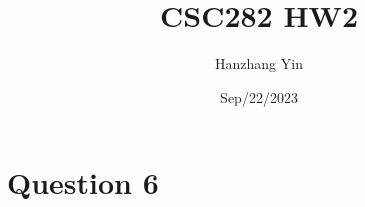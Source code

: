 \documentclass{article}
\title{CSC282 HW2}
\author{Hanzhang Yin}
\date{Sep/22/2023}
\begin{document}
\maketitle

\section*{Question 6}


\begin{comment}
# Helper Function
function CCW(p1, p2, p3):
    #True if counter-clockwise turn
    return (p2.x - p1.x) * (p3.y - p1.y) - (p2.y - p1.y) * (p3.x - p1.x) > 0  

function sortPointsLexicographically(points):
    # Sort the points by x-coordinate, breaking ties with y-coordinate
    # Time-complexity O(n log n)
    return sorted(points, key: (point.x, point.y))

# Main Function (Andrew's Algorithm)
function constructSimplePolygon(points):
    # Sort points lexicographically
    sortedPoints = sortPointsLexicographically(points)

    # Build the upper chain
    upperChain = []
    for point in sortedPoints:
        upperChain.append(point)
        while len(upperChain) >= 3 and not CCW_left(upperChain[len(upperChain) - 3],
                                                    upperChain[len(upperChain) - 2],
                                                    upperChain[len(upperChain) - 1]):
            # Remove the middle point to maintain the CCW property
            upperChain.pop(len(upperChain) - 2)

    # Build the lower chain
    lowerChain = []
    for point in reverse(sortedPoints):
        lowerChain.append(point)
        while len(lowerChain) >= 3 and not CCW_left(lowerChain[len(lowerChain) - 3],
                                                    lowerChain[len(lowerChain) - 2],
                                                    lowerChain[len(lowerChain) - 1]):
            # Remove the middle point to maintain the CCW property
            lowerChain.pop(len(lowerChain) - 2)

    # Combine the chains to form the simple polygon
    upperChain.pop(len(upperChain) - 1)
    lowerChain.pop(len(lowerChain) - 1)
    polygon = upperChain + lowerChain

    # Return the polygon containing all points
    return polygon
\end{comment}
\end{document}
